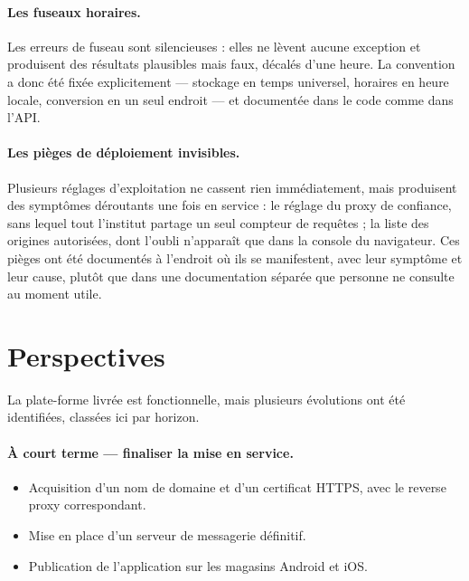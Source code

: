 \paragraph{Les fuseaux horaires.} Les erreurs de fuseau sont silencieuses :
elles ne lèvent aucune exception et produisent des résultats plausibles mais
faux, décalés d'une heure. La convention a donc été fixée explicitement ---
stockage en temps universel, horaires en heure locale, conversion en un seul
endroit --- et documentée dans le code comme dans l'API.

\paragraph{Les pièges de déploiement invisibles.} Plusieurs réglages
d'exploitation ne cassent rien immédiatement, mais produisent des symptômes
déroutants une fois en service : le réglage du proxy de confiance, sans lequel
tout l'institut partage un seul compteur de requêtes ; la liste des origines
autorisées, dont l'oubli n'apparaît que dans la console du navigateur. Ces
pièges ont été documentés à l'endroit où ils se manifestent, avec leur symptôme
et leur cause, plutôt que dans une documentation séparée que personne ne
consulte au moment utile.

\section*{Perspectives}

La plate-forme livrée est fonctionnelle, mais plusieurs évolutions ont été
identifiées, classées ici par horizon.

\paragraph{À court terme --- finaliser la mise en service.}
\begin{itemize}[leftmargin=1.2cm,nosep]
  \item Acquisition d'un nom de domaine et d'un certificat HTTPS, avec le
  reverse proxy correspondant.
  \item Mise en place d'un serveur de messagerie définitif.
  \item Publication de l'application sur les magasins Android et iOS.
\end{itemize}

